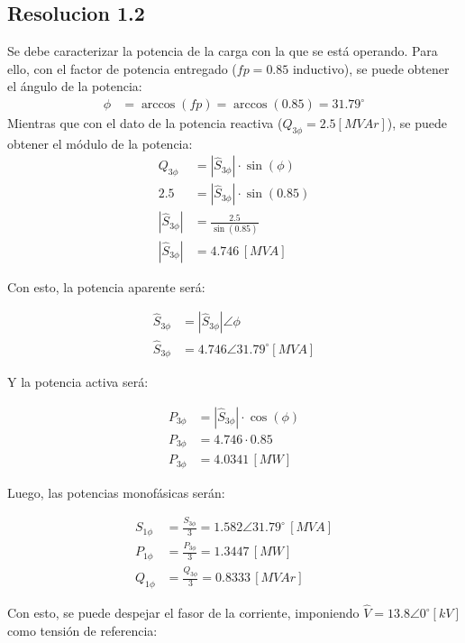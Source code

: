 \documentclass[
  11pt,
  letterpaper,
   addpoints,
   answers
  ]{exam}
\begin{document}
\begin{questions}
\begin{solution}
        \subsection*{Resolucion 1.2}
       Se debe caracterizar la potencia de la carga con la que se está operando. Para ello, con el factor de potencia entregado (\( fp = 0.85 \) inductivo), se puede obtener el ángulo de la potencia:
    \begin{align}
        \phi &= \arccos(fp) = \arccos(0.85) = 31.79^\circ
    \end{align}
    Mientras que con el dato de la potencia reactiva (\( Q_{3\phi} = 2.5 [MVAr] \)), se puede obtener el módulo de la potencia:
    \begin{align}
        Q_{3\phi} &= |\hat{S}_{3\phi}| \cdot \sin(\phi) \\
        2.5 &= |\hat{S}_{3\phi}| \cdot \sin(0.85) \\
    |\hat{S}_{3\phi}| &= \frac{2.5}{\sin(0.85)} \\
    |\hat{S}_{3\phi}| &= 4.746 \, [MVA]
    \end{align}

Con esto, la potencia aparente será:

\begin{align}
\hat{S}_{3\phi} &= |\hat{S}_{3\phi}| \angle \phi \\
\hat{S}_{3\phi} &= 4.746 \angle 31.79^\circ [MVA]
\end{align}

Y la potencia activa será:

\begin{align}
P_{3\phi} &= |\hat{S}_{3\phi}| \cdot \cos(\phi) \\
P_{3\phi} &= 4.746 \cdot 0.85 \\
P_{3\phi} &= 4.0341 \, [MW]
\end{align}

Luego, las potencias monofásicas serán:

\begin{align}
S_{1\phi} &= \frac{S_{3\phi}}{3} = 1.582 \angle 31.79^\circ \, [MVA] \\
P_{1\phi} &= \frac{P_{3\phi}}{3} = 1.3447 \, [MW] \\
Q_{1\phi} &= \frac{Q_{3\phi}}{3} = 0.8333 \, [MVAr]
\end{align}

Con esto, se puede despejar el fasor de la corriente, imponiendo \( \hat{V} = 13.8 \angle 0^\circ [kV] \) como tensión de referencia:


\end{solution}
\end{questions}
\end{document}
